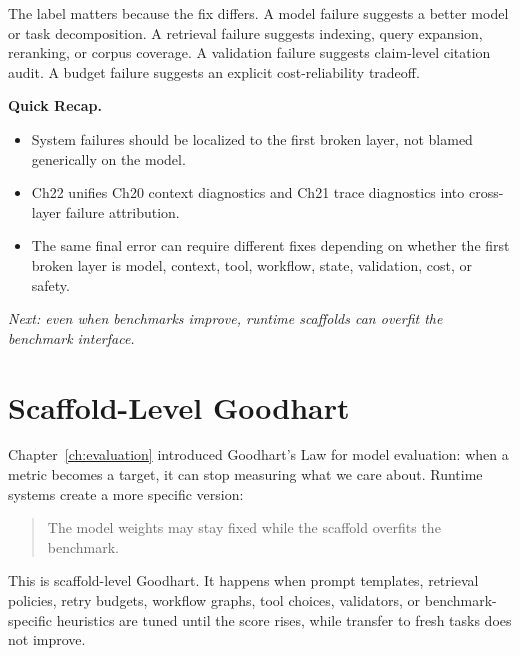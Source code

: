 The label matters because the fix differs. A model failure suggests a better model or task decomposition. A retrieval failure suggests indexing, query expansion, reranking, or corpus coverage. A validation failure suggests claim-level citation audit. A budget failure suggests an explicit cost-reliability tradeoff.

\noindent{}

\begin{quickrecap}
\textbf{Quick Recap.}
\begin{itemize}[nosep,leftmargin=1.5em]
  \item System failures should be localized to the first broken layer, not blamed generically on the model.
  \item Ch22 unifies Ch20 context diagnostics and Ch21 trace diagnostics into cross-layer failure attribution.
  \item The same final error can require different fixes depending on whether the first broken layer is model, context, tool, workflow, state, validation, cost, or safety.
\end{itemize}
\textit{Next: even when benchmarks improve, runtime scaffolds can overfit the benchmark interface.}
\end{quickrecap}


\section{Scaffold-Level Goodhart}
\label{sec:ch22-scaffold-goodhart}

Chapter~\ref{ch:evaluation} introduced Goodhart's Law for model evaluation: when a metric becomes a target, it can stop measuring what we care about. Runtime systems create a more specific version:

\begin{quote}
The model weights may stay fixed while the scaffold overfits the benchmark.
\end{quote}

This is scaffold-level Goodhart. It happens when prompt templates, retrieval policies, retry budgets, workflow graphs, tool choices, validators, or benchmark-specific heuristics are tuned until the score rises, while transfer to fresh tasks does not improve.

